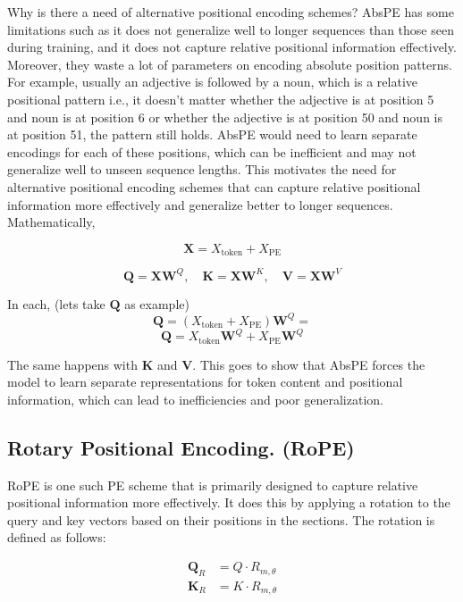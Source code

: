 \documentclass[10pt]{article}
\theoremstyle{plain}
\begin{document}
Why is there a need of alternative positional encoding schemes? AbsPE has some limitations such as it does not generalize well to longer sequences than those seen during training, and it does not capture relative positional information effectively. Moreover, they waste a lot of parameters on encoding absolute position patterns. For example, usually an adjective is followed by a noun, which is a relative positional pattern i.e., it doesn't matter whether the adjective is at position 5 and noun is at position 6 or whether the adjective is at position 50 and noun is at position 51, the pattern still holds. AbsPE would need to learn separate encodings for each of these positions, which can be inefficient and may not generalize well to unseen sequence lengths. This motivates the need for alternative positional encoding schemes that can capture relative positional information more effectively and generalize better to longer sequences. Mathematically,


\[
    \mathbf{X} = X_{\text{token}} + X_{\text{PE}} 
\]

\[
    \mathbf{Q} = \mathbf{X} \mathbf{W}^Q, \quad \mathbf{K} = \mathbf{X} \mathbf{W}^K, \quad \mathbf{V} = \mathbf{X} \mathbf{W}^V
\]

In each, (lets take \(\mathbf{Q}\) as example)
\[
    \mathbf{Q} = (X_{\text{token}} + X_{\text{PE}}) \mathbf{W}^Q = 
\]
\[
    \mathbf{Q} = X_{\text{token}} \mathbf{W}^Q + X_{\text{PE}} \mathbf{W}^Q
\]

The same happens with \(\mathbf{K}\) and \(\mathbf{V}\). This goes to show that AbsPE forces the model to learn separate representations for token content and positional information, which can lead to inefficiencies and poor generalization.   

\vspace{0.1in}

\subsection{Rotary Positional Encoding. (RoPE)}

RoPE is one such PE scheme that is primarily designed to capture relative positional information more effectively. It does this by applying a rotation to the query and key vectors based on their positions in the sections. The rotation is defined as follows:

\begin{align*}
    \mathbf{Q}_R &= Q \cdot R_{m, \theta} \\
    \mathbf{K}_R &= K \cdot R_{m, \theta}
\end{align*}
\end{document}
